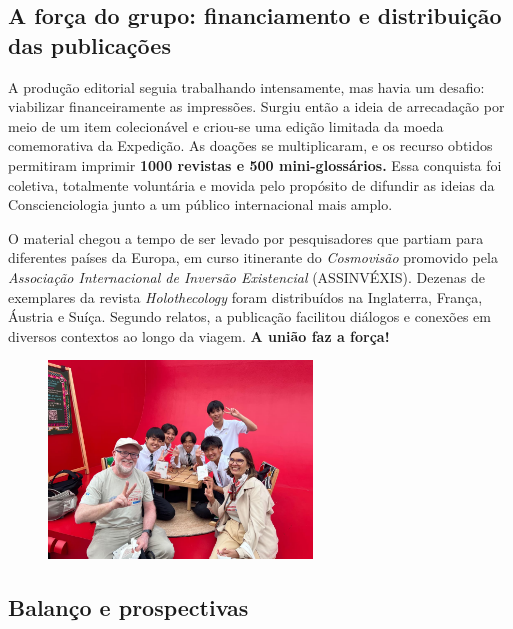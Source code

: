 \documentclass{gescons}
\begin{document}
\subsection*{A força do grupo: financiamento e distribuição das publicações}


A produção editorial seguia trabalhando intensamente, mas havia um desafio: viabilizar financeiramente as impressões. Surgiu então a ideia de arrecadação por meio de um item colecionável e criou-se uma edição limitada da moeda comemorativa da Expedição. As doações se multiplicaram, e os recurso obtidos permitiram imprimir \textbf{1000 revistas e 500 mini-glossários.} Essa conquista foi coletiva, totalmente voluntária e movida pelo propósito de difundir as ideias da Conscienciologia junto a um público internacional mais amplo.

O material chegou a tempo de ser levado por pesquisadores que partiam para diferentes países da Europa, em curso itinerante do \emph{Cosmovisão} promovido pela \emph{Associação Internacional de Inversão Existencial} (ASSINVÉXIS). Dezenas de exemplares da revista \emph{Holothecology} foram distribuídos na Inglaterra, França, Áustria e Suíça. Segundo relatos, a publicação facilitou diálogos e conexões em diversos contextos ao longo da viagem. \textbf{A união faz a força!}

\begin{figure}
  \vspace{-15mm}\hspace{-8mm}\includegraphics[width=7cm]{articles/resumo/fotos/materia3/japao.jpeg}
\end{figure}

\subsection*{Balanço e prospectivas}
\end{document}
